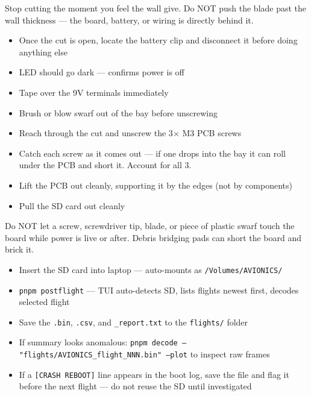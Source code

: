 \documentclass[11pt,a4paper,oneside]{report}
\begin{document}
\begin{warnbox}
Stop cutting the moment you feel the wall give. Do NOT push the blade past the wall thickness --- the board, battery, or wiring is directly behind it.
\end{warnbox}

\begin{itemize}
  \item Once the cut is open, locate the battery clip and disconnect it before doing anything else
  \item LED should go dark --- confirms power is off
  \item Tape over the 9V terminals immediately
\end{itemize}

\begin{itemize}
  \item Brush or blow swarf out of the bay before unscrewing
  \item Reach through the cut and unscrew the 3$\times$ M3 PCB screws
  \item Catch each screw as it comes out --- if one drops into the bay it can roll under the PCB and short it. Account for all 3.
  \item Lift the PCB out cleanly, supporting it by the edges (not by components)
  \item Pull the SD card out cleanly
\end{itemize}

\begin{warnbox}
Do NOT let a screw, screwdriver tip, blade, or piece of plastic swarf touch the board while power is live or after. Debris bridging pads can short the board and brick it.
\end{warnbox}

\begin{itemize}
  \item Insert the SD card into laptop --- auto-mounts as \texttt{/Volumes/AVIONICS/}
  \item \texttt{pnpm postflight} --- TUI auto-detects SD, lists flights newest first, decodes selected flight
  \item Save the \texttt{.bin}, \texttt{.csv}, and \texttt{\_report.txt} to the \texttt{flights/} folder
  \item If summary looks anomalous: \texttt{pnpm decode -- "flights/AVIONICS\_flight\_NNN.bin" --plot} to inspect raw frames
  \item If a \texttt{[CRASH REBOOT]} line appears in the boot log, save the file and flag it before the next flight --- do not reuse the SD until investigated
\end{itemize}
\end{document}
